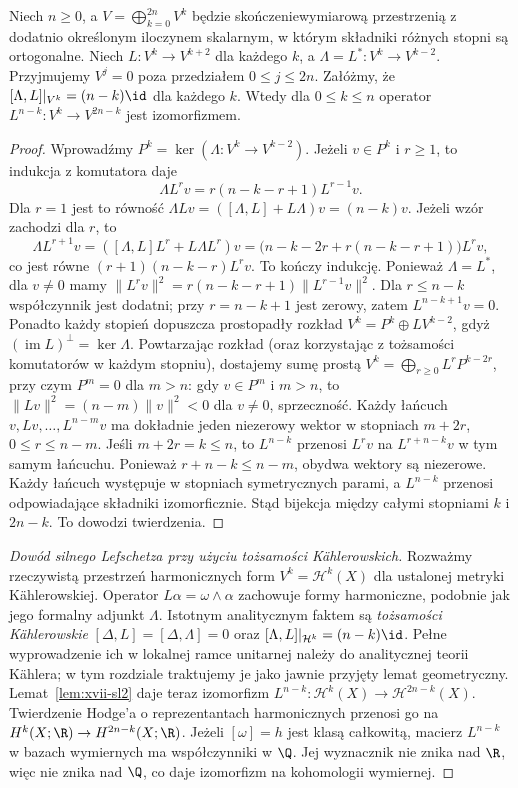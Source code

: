 \begin{lemat}
\label{lem:xvii-sl2}
Niech $n\ge0$, a
$V=\bigoplus_{k=0}^{2n}V^k$ będzie skończeniewymiarową
przestrzenią z dodatnio określonym iloczynem skalarnym,
w którym składniki różnych stopni są ortogonalne.
Niech $L:V^k\to V^{k+2}$ dla każdego $k$,
a $\Lambda=L^*:V^k\to V^{k-2}$.
Przyjmujemy $V^j=0$ poza przedziałem $0\le j\le2n$.
Załóżmy, że $[\Lambda,L]|_{V^k}=(n-k)\id$ dla każdego $k$.
Wtedy dla $0\le k\le n$ operator
$L^{n-k}:V^k\to V^{2n-k}$ jest izomorfizmem.
\end{lemat}
\begin{proof}
Wprowadźmy $P^k=\ker(\Lambda:V^k\to V^{k-2})$.
Jeżeli $v\in P^k$ i $r\ge1$, to indukcja z komutatora daje
\[
\Lambda L^rv=r(n-k-r+1)L^{r-1}v.
\]
Dla $r=1$ jest to równość
$\Lambda Lv=([\Lambda,L]+L\Lambda)v=(n-k)v$.
Jeżeli wzór zachodzi dla $r$, to
\[
\Lambda L^{r+1}v
=([\Lambda,L]L^r+L\Lambda L^r)v
=\bigl(n-k-2r+r(n-k-r+1)\bigr)L^rv,
\]
co jest równe $(r+1)(n-k-r)L^rv$.
To kończy indukcję.
Ponieważ $\Lambda=L^*$, dla $v\ne0$ mamy
$\|L^rv\|^2=r(n-k-r+1)\|L^{r-1}v\|^2$.
Dla $r\le n-k$ współczynnik jest dodatni; przy
$r=n-k+1$ jest zerowy, zatem $L^{n-k+1}v=0$.
Ponadto każdy stopień dopuszcza prostopadły rozkład
$V^k=P^k\oplus LV^{k-2}$, gdyż $(\operatorname{im}L)^\perp=\ker\Lambda$.
Powtarzając rozkład (oraz korzystając z tożsamości komutatorów
w każdym stopniu), dostajemy sumę prostą
$V^k=\bigoplus_{r\ge0}L^rP^{k-2r}$, przy czym
$P^m=0$ dla $m>n$: gdy $v\in P^m$ i $m>n$, to
$\|Lv\|^2=(n-m)\|v\|^2<0$ dla $v\ne0$, sprzeczność.
Każdy łańcuch $v,Lv,\ldots,L^{n-m}v$ ma dokładnie
jeden niezerowy wektor w stopniach $m+2r$,
$0\le r\le n-m$. Jeśli $m+2r=k\le n$, to $L^{n-k}$
przenosi $L^rv$ na $L^{r+n-k}v$ w tym samym
łańcuchu. Ponieważ $r+n-k\le n-m$,
obydwa wektory są niezerowe. Każdy łańcuch
występuje w stopniach symetrycznych parami,
a $L^{n-k}$ przenosi odpowiadające składniki
izomorficznie. Stąd bijekcja między całymi
stopniami $k$ i $2n-k$.
To dowodzi twierdzenia.
\end{proof}
\begin{proof}[Dowód silnego Lefschetza przy użyciu tożsamości Kählerowskich]
Rozważmy rzeczywistą przestrzeń harmonicznych form
$V^k=\mathcal H^k(X)$ dla ustalonej metryki Kählerowskiej.
Operator $L\alpha=\omega\wedge\alpha$ zachowuje formy
harmoniczne, podobnie jak jego formalny adjunkt $\Lambda$.
Istotnym analitycznym faktem są \emph{tożsamości Kählerowskie}
$[\Delta,L]=[\Delta,\Lambda]=0$ oraz
$[\Lambda,L]|_{\mathcal H^k}=(n-k)\id$.
Pełne wyprowadzenie ich w lokalnej ramce unitarnej należy do
analitycznej teorii Kählera; w tym rozdziale traktujemy je jako
jawnie przyjęty lemat geometryczny.
Lemat~\ref{lem:xvii-sl2} daje teraz izomorfizm
$L^{n-k}:\mathcal H^k(X)\to\mathcal H^{2n-k}(X)$.
Twierdzenie Hodge'a o reprezentantach harmonicznych
przenosi go na $H^k(X;\R)\to H^{2n-k}(X;\R)$.
Jeżeli $[\omega]=h$ jest klasą całkowitą,
macierz $L^{n-k}$ w bazach wymiernych ma współczynniki
w $\Q$. Jej wyznacznik nie znika nad $\R$, więc nie znika
nad $\Q$, co daje izomorfizm na kohomologii wymiernej.
\end{proof}

